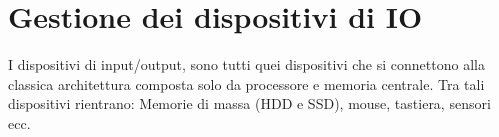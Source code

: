 \chapter{Gestione dei dispositivi di IO}
I dispositivi di input/output, sono tutti quei dispositivi che si connettono alla classica architettura composta solo da processore e memoria centrale. Tra tali dispositivi rientrano: Memorie di massa (HDD e SSD), mouse, tastiera, sensori ecc.



